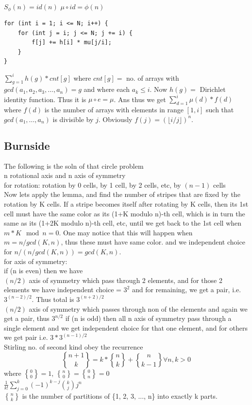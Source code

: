 \documentclass[8pt, a4paper, oneside, twocolumn]{extarticle}
\DeclareRobustCommand{\stirling}{\genfrac\{\}{0pt}{}}
\begin{document}
\\$S_{\phi}(n) = id(n)$
$\mu \circ id = \phi (n)$
\begin{verbatim}
for (int i = 1; i <= N; i++) { 
    for (int j = i; j <= N; j += i) {
        f[j] += h[i] * mu[j/i];
    } 
}
\end{verbatim}
$\sum_{g = 1}^{i}h(g)*cnt[g]$ where $cnt[g] = $ no. of arrays with $gcd(a_1, a_2, a_3, ..., a_n) = g$ and where each $a_k \leq i$. Now $h(g) = $ Dirichlet identity function. Thus it is $\mu \circ e = \mu$. Ans thus we get $\sum_{d = 1}^{i}\mu(d)*f(d)$ where $f(d)$ is the number of arrays with elements in range $[1, i]$ such that $gcd(a_1, \dots, a_n)$ is divisible by $j$. Obviously $f(j) = (\lfloor i/j \rfloor)^n$.
\subsection{Burnside}
The following is the soln of that circle problem
\\n rotational axis and n axis of symmetry 
\\for rotation: rotation by 0 cells, by 1 cell, by 2 cells, etc, by $(n-1)$ cells
\\Now lets apply the lemma, and find the number of stripes that are fixed by the rotation by K cells. If a stripe becomes itself after rotating by K cells, then its 1st cell must have the same color as its (1+K modulo n)-th cell, which is in turn the same as its (1+2K modulo n)-th cell, etc, until we get back to the 1st cell when $m*K \mod n=0$. One may notice that this will happen when $m=n/gcd(K,n)$, thus these must have same color. and we independent choice for $n/(n/gcd(K, n)) = gcd(K, n)$.
\\for axis of symmetry:
\\if (n is even) then we have 
    \\$(n/2)$ axis of symmetry which pass through 2 elements, and for those 2 elements we have independent choice = $3^2$ and for remaining, we get a pair, i.e. $3^{(n - 2)/2}$. Thus total is $3^{(n + 2)/2}$
    \\$(n/2)$ axis of symmetry which passes through non of the elements and again we get a pair, thus $3^{n/2}$ 
if (n is odd) then all n axis of symmetry pass through a single element and we get independent choice for that one element, and for others we get pair i.e. $3 * 3^{(n - 1)/2}$
\\Stirling no. of second kind obey the recurrence $$\stirling{n + 1}{k} = k * \stirling{n}{k} + \stirling{n}{k - 1} \forall n, k > 0$$ where $\stirling{0}{0} = 1$, $\stirling{n}{0} = \stirling{0}{n} = 0$
\\$\frac{1}{k!}\sum_{j=0}^{k}(-1)^{k-j}\binom{k}{j}j^n$
\\$\stirling{n}{k}$ is the number of partitions of \{1, 2, 3, ..., n\} into exactly k parts. 
\end{document}
